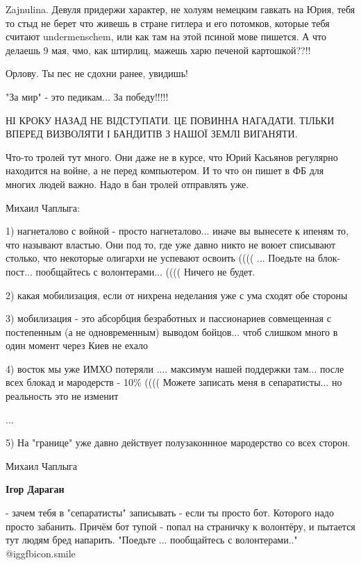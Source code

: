 \begin{itemize}
Zajnulina. Девуля придержи характер, не холуям немецким гавкать на Юрия, тебя
то стыд не берет что живешь в стране гитлера и его потомков, которые тебя
считают undermenschem, или как там на этой псиной мове пишется. А что делаешь 9
мая, чмо, как штирлиц, мажешь харю печеной картошкой??!!

Орлову. Ты пес не сдохни ранее, увидишь!

"За мир" - это педикам... За победу!!!!!


НІ КРОКУ НАЗАД НЕ ВІДСТУПАТИ. ЦЕ ПОВИННА НАГАДАТИ. ТІЛЬКИ ВПЕРЕД ВИЗВОЛЯТИ І
БАНДИТІВ З НАШОЇ ЗЕМЛІ ВИГАНЯТИ.


Что-то тролей тут много. Они даже не в курсе, что Юрий Касьянов регулярно
находится на войне, а не перед компьютером. И то что он пишет в ФБ для многих
людей важно. Надо в бан тролей отправлять уже.


Михаил Чаплыга:

1) нагнеталово с войной - просто нагнеталово... иначе вы вынесете к ипеням то,
что называют властью. Они под то, где уже давно никто не воюет списывают
столько, что некоторые олигархи не успевают освоить (((( ... Поедьте на
блок-пост...  пообщайтесь с волонтерами... (((( Ничего не будет.

2) какая мобилизация, если от нихрена неделания уже с ума сходят обе стороны

3) мобилизация - это абсорбция безработных и пассионариев совмещенная с
постепенным (а не одновременным) выводом бойцов... чтоб слишком много в один
момент через Киев не ехало

4) восток мы уже ИМХО потеряли ....  максимум нашей поддержки там... после всех
блокад и мародерств - 10\% (((( Можете записать меня в сепаратисты... но
реальность это не изменит

...  

5) На "границе" уже давно действует полузаконнное мародерство со всех сторон.  

Михаил Чаплыга

\textbf{Ігор Дараган} 

- зачем тебя в "сепаратисты" записывать - если ты просто бот. Которого надо
просто забанить.  Причём бот тупой - попал на страничку к волонтёру, и пытается
тут людям бред напарить. "Поедьте ... пообщайтесь с волонтерами.."  @igg{fbicon.smile} 


\end{itemize}
